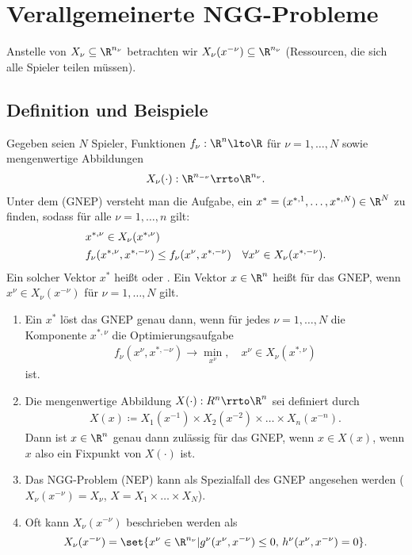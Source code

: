 
\section{Verallgemeinerte NGG-Probleme}
\label{part:verallg-ngg-probl}
Anstelle von $X_{\nu}\subseteq \R^{n_{\nu}}$ betrachten wir $X_{\nu}(x^{-\nu}) \subseteq \R^{n_{\nu}}$ (Ressourcen, die sich alle Spieler teilen müssen).
\subsection{Definition und Beispiele}
\label{sec:defin-und-beisp}
\begin{definition*}
  Gegeben seien $N$ Spieler, Funktionen $f_{\nu}: \R^{n} \lto \R$ für $\nu = 1, \dots, N$ sowie mengenwertige Abbildungen
  \begin{align*}
    X_{\nu}(\cdot): \R^{n_{-\nu}} \rrto\R^{n_{\nu}}. 
  \end{align*}
Unter dem  (GNEP) versteht man die Aufgabe, ein $x^{*} = (x^{*, 1}, \dots, x^{*, N}) \in \R^{N}$ zu finden, sodass für alle $\nu = 1, \dots, n$ gilt:
\begin{align}\label{eq:4-1}
&  x^{*, \nu} \in X_{\nu}(x^{*, \nu}) \notag\\
&  f_{\nu}(x^{*, \nu}, x^{*, -\nu}) \leq f_{\nu}(x^{\nu}, x^{*, -\nu}) \quad \forall x^{\nu} \in X_{\nu}(x^{*, -\nu}). 
\end{align}
Ein solcher Vektor $x^{*}$ heißt  oder . Ein Vektor $x \in \R^{n}$ heißt  für das GNEP, wenn $x^{\nu} \in X_{\nu}(x^{-\nu})$ für $\nu = 1, \dots, N$ gilt.  
\end{definition*}
\begin{bemerkung*}
  \begin{enumerate}
  \item Ein $x^{*}$ löst das GNEP genau dann, wenn für jedes $\nu= 1,\dots, N$ die Komponente $x^{*, \nu}$ die Optimierungsaufgabe
    \begin{align*}
      f_{\nu}(x^{\nu}, x^{*, -\nu}) \to \min_{x^{\nu}}, \quad x^{\nu} \in X_{\nu}(x^{*, \nu})
    \end{align*}
ist. 
\item Die mengenwertige Abbildung $X(\cdot): R^{n}\rrto \R^{n}$ sei definiert durch
  \begin{align*}
    X(x) \coloneqq X_{1}(x^{-1}) \times X_{2}(x^{-2}) \times \dots \times X_{n}(x^{-n}). 
  \end{align*}
Dann ist $x \in \R^{n}$ genau dann zulässig für das GNEP, wenn $x \in X(x)$, wenn $x$ also ein Fixpunkt von $X(\cdot)$ ist. 
\item Das NGG-Problem (NEP) kann als Spezialfall des GNEP angesehen werden ($X_\nu(x^{-\nu}) = X_{\nu}$, $X = X_{1} \times \dots \times X_{N}$). 
\item Oft kann $X_{\nu}(x^{-\nu})$ beschrieben werden als
  \begin{align*}
    X_{\nu}(x^{-\nu}) = \set{x^{\nu} \in \R^{n_{\nu}}| g^{\nu}(x^{\nu}, x^{-\nu})\leq 0, \, h^{\nu}(x^{\nu}, x^{-\nu}) = 0}. 
  \end{align*}
  \end{enumerate}
\end{bemerkung*}
